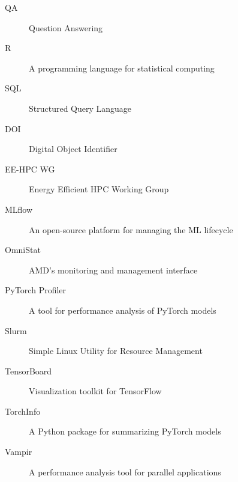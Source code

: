 \begin{description}
\item[QA] Question Answering
\item[R] A programming language for statistical computing
\item[SQL] Structured Query Language
\end{description}


\begin{description}
\item[DOI] Digital Object Identifier
\item[EE-HPC WG] Energy Efficient HPC Working Group
\end{description}


\begin{description}
\item[MLflow] An open-source platform for managing the ML lifecycle
\item[OmniStat] AMD's monitoring and management interface
\item[PyTorch Profiler] A tool for performance analysis of PyTorch models
\item[Slurm] Simple Linux Utility for Resource Management
\item[TensorBoard] Visualization toolkit for TensorFlow
\item[TorchInfo] A Python package for summarizing PyTorch models
\item[Vampir] A performance analysis tool for parallel applications

\end{description}






